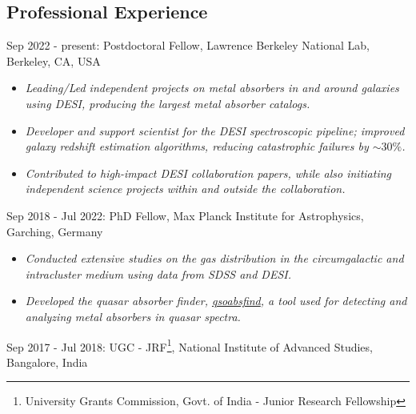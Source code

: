 \documentclass[12pt,letterpaper]{article}
\begin{document}
\subsection{Professional Experience}
\begin{list}{}{\cvlist}
\item Sep 2022 - present: Postdoctoral Fellow, Lawrence Berkeley National Lab, Berkeley, CA, USA \\
\begin{itemize}
\item \emph{Leading/Led independent projects on metal absorbers in and around galaxies using DESI, producing the largest metal absorber catalogs.}
 \item \emph{Developer and support scientist for the DESI spectroscopic pipeline; improved galaxy redshift estimation algorithms, reducing catastrophic failures by $\sim30\%$.}
  \item \emph{Contributed to high-impact DESI collaboration papers, while also initiating independent science projects within and outside the collaboration.}
  \vspace{-1mm}
\end{itemize}
\item Sep 2018 - Jul 2022: PhD Fellow, Max Planck Institute for Astrophysics, Garching, Germany
\begin{itemize}
\item \emph{Conducted extensive studies on the gas distribution in the circumgalactic and intracluster medium using data from SDSS and DESI.}
  \vspace{-1mm}
\item \emph{Developed the quasar absorber finder, \href{https://github.com/abhi0395/qsoabsfind}{qsoabsfind}, a tool used for detecting and analyzing metal absorbers in quasar spectra.}
\end{itemize}
\item Sep 2017 - Jul 2018: UGC - JRF\footnote{University Grants Commission, Govt. of India - Junior Research Fellowship}, National Institute of Advanced Studies, Bangalore, India
\end{list}
\vspace{-1.5mm}
\end{document}
